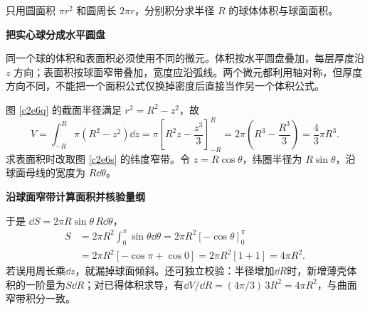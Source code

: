 \begin{question}
\begin{example}[球的体积与表面积]
只用圆面积 $\pi r^2$ 和圆周长 $2\pi r$，分别积分求半径 $R$ 的球体体积与球面面积。
\end{example}
\end{question}
\begin{solution}\textbf{把实心球分成水平圆盘}\par\nobreak
同一个球的体积和表面积必须使用不同的微元。体积按水平圆盘叠加，每层厚度沿 $z$ 方向；表面积按球面窄带叠加，宽度应沿弧线。两个微元都利用轴对称，但厚度方向不同，不能把一个面积公式仅换掉密度后直接当作另一个体积公式。

图 \ref{c2e6q} 的截面半径满足 $r^2=R^2-z^2$，故
\[
 V=\int_{-R}^R\pi(R^2-z^2)\dd z
 =\pi\left[R^2z-\frac{z^3}{3}\right]_{-R}^{R}
 =2\pi\left(R^3-\frac{R^3}{3}\right)
 =\boxed{\frac43\pi R^3}.
\]
求表面积时改取图 \ref{c2e6s} 的纬度窄带。令 $z=R\cos\theta$，纬圈半径为 $R\sin\theta$，沿球面母线的宽度为 $R\dd\theta$。



\par\medskip{}\noindent\textbf{沿球面窄带计算面积并核验量纲}\par\nobreak
于是 $\dd S=2\pi R\sin\theta\,R\dd\theta$，
\[
 \begin{aligned}
 S&=2\pi R^2\int_0^\pi\sin\theta\dd\theta
 =2\pi R^2[-\cos\theta]_0^\pi\\
 &=2\pi R^2[-\cos\pi+\cos0]
 =2\pi R^2[1+1]=\boxed{4\pi R^2}.
 \end{aligned}
\]
若误用周长乘$\dd z$，就漏掉球面倾斜。还可独立校验：半径增加$\dd R$时，新增薄壳体积的一阶量为$S\dd R$；对已得体积求导，有$\dd V/\dd R=(4\pi/3)\,3R^2=4\pi R^2$，与曲面窄带积分一致。
\end{solution}

